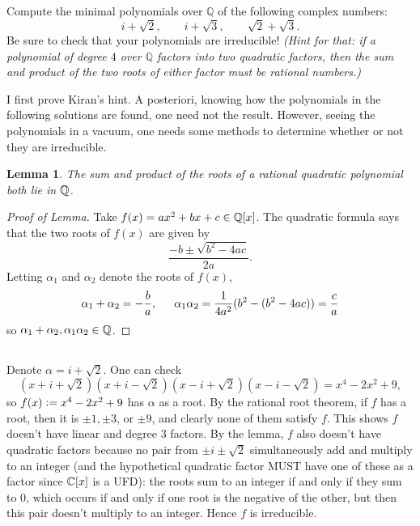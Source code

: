 \documentclass[12pt]{article}
\newtheorem*{lemma}{Lemma}
\begin{document}
\section{} 
Compute the minimal polynomials over $\mathbb{Q}$ of the following complex numbers:
\[
  i + \sqrt{2}, \qquad i + \sqrt{3}, \qquad \sqrt{2} + \sqrt{3}.
\]
Be sure to check that your polynomials are irreducible! \emph{(Hint for that: if a polynomial of degree $4$ over $\mathbb{Q}$ factors into two quadratic factors, then the sum \emph{and} product of the two roots of either factor must be rational numbers.)}

\noindent\dotfill 

I first prove Kiran's hint. 
A posteriori, knowing how the polynomials in the following solutions are found, one need not the result. 
However, seeing the polynomials in a vacuum, one needs some methods to determine whether or not they are irreducible. 
\begin{lemma}
  The sum and product of the roots of a rational quadratic polynomial  both lie in $\mathbb{Q}$. 
\end{lemma}
\begin{proof}[Proof of Lemma]
  Take $f(x) = ax^2 + bx + c \in \mathbb{Q}[x]$. 
  The quadratic formula says that the two roots of $f(x)$ are given by 
  $$\frac{-b \pm \sqrt{b^2 - 4ac}}{2a}.$$
  Letting $\alpha_1$ and $\alpha_2$ denote the roots of $f(x)$, 
  $$\alpha_1 + \alpha_2 = -\frac{b}{a}, \hspace{1.5em} \alpha_1 \alpha_2 = \frac{1}{4a^2}(b^2 - (b^2 - 4ac)) = \frac{c}{a}$$
  so $\alpha_1 + \alpha_2, \alpha_1\alpha_2 \in \mathbb{Q}$. 
\end{proof}

\subsection{}
Denote $\alpha = i + \sqrt{2}$. 
One can check 
$$(x + i + \sqrt{2})(x + i - \sqrt{2})(x - i + \sqrt{2})(x - i - \sqrt{2}) = x^4 - 2x^2 + 9,$$
so $f(x) \vcentcolon= x^4 - 2x^2 + 9$ has $\alpha$ as a root. 
By the rational root theorem, if $f$ has a root, then it is $\pm 1, \pm 3$, or $\pm 9$, and clearly none of them satisfy $f$. 
This shows $f$ doesn't have linear and degree 3 factors. 
By the lemma, $f$ also doesn't have quadratic factors because no pair from $\pm i \pm \sqrt{2}$ simultaneously add and multiply to an integer (and the hypothetical quadratic factor MUST have one of these as a factor since $\mathbb{C}[x]$ is a UFD): 
the roots sum to an integer if and only if they sum to 0, which occurs if and only if one root is the negative of the other, but then this pair doesn't multiply to an integer.
Hence $f$ is irreducible. 
\end{document}
